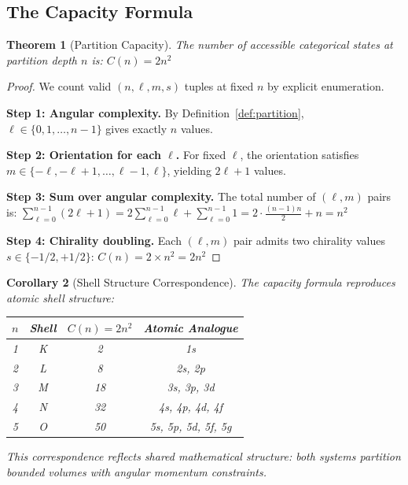 \documentclass[twocolumn,10pt]{article}
\newtheorem{theorem}{Theorem}[section]
\newtheorem{corollary}[theorem]{Corollary}
\begin{document}
\subsection{The Capacity Formula}

\begin{theorem}[Partition Capacity]
\label{thm:capacity}
The number of accessible categorical states at partition depth $n$ is:
$
C(n) = 2n^2
$
\end{theorem}

\begin{proof}
We count valid $(n, \ell, m, s)$ tuples at fixed $n$ by explicit enumeration.

\textbf{Step 1: Angular complexity.} By Definition~\ref{def:partition}, $\ell \in \{0, 1, \ldots, n-1\}$ gives exactly $n$ values.

\textbf{Step 2: Orientation for each $\ell$.} For fixed $\ell$, the orientation satisfies $m \in \{-\ell, -\ell+1, \ldots, \ell-1, \ell\}$, yielding $2\ell + 1$ values.

\textbf{Step 3: Sum over angular complexity.} The total number of $(\ell, m)$ pairs is:
$
\sum_{\ell=0}^{n-1} (2\ell + 1) = 2\sum_{\ell=0}^{n-1} \ell + \sum_{\ell=0}^{n-1} 1 = 2 \cdot \frac{(n-1)n}{2} + n = n^2
$

\textbf{Step 4: Chirality doubling.} Each $(\ell, m)$ pair admits two chirality values $s \in \{-1/2, +1/2\}$:
$
C(n) = 2 \times n^2 = 2n^2
$
\end{proof}

\begin{corollary}[Shell Structure Correspondence]
\label{cor:shell}
The capacity formula reproduces atomic shell structure:
\begin{center}
\begin{tabular}{cccc}
\toprule
$n$ & Shell & $C(n) = 2n^2$ & Atomic Analogue \\
\midrule
1 & K & 2 & 1s \\
2 & L & 8 & 2s, 2p \\
3 & M & 18 & 3s, 3p, 3d \\
4 & N & 32 & 4s, 4p, 4d, 4f \\
5 & O & 50 & 5s, 5p, 5d, 5f, 5g \\
\bottomrule
\end{tabular}
\end{center}
This correspondence reflects shared mathematical structure: both systems partition bounded volumes with angular momentum constraints.
\end{corollary}
\end{document}
